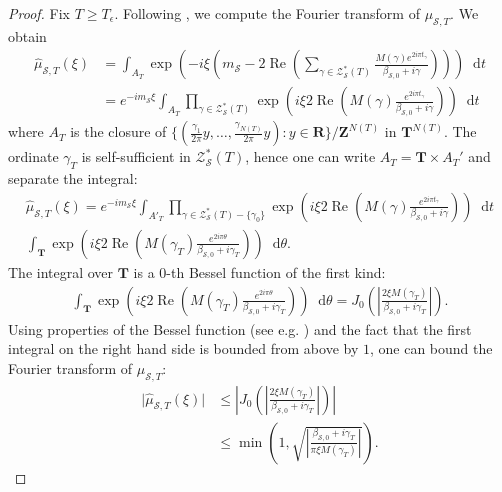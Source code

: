 \documentclass[a4paper,10pt]{amsart}
\theoremstyle{plain}
\theoremstyle{definition}
\begin{document}
\begin{proof}
Fix $T\geq T_{\epsilon}$.
	Following \cite[Part 3.1]{RS}, we compute the Fourier transform of $\mu_{\mathcal{S},T}$.
	We obtain
\begin{align*}
\hat{\mu}_{\mathcal{S},T}(\xi) &= \int_{A_{T}}\exp\left( -i\xi \left( m_{\mathcal{S}} - 2\operatorname{Re}\left(\sum_{\gamma\in\mathcal{Z}_{\mathcal{S}}^{*}(T)}\frac{M(\gamma)e^{2i\pi t_{\gamma}}}{\beta_{\mathcal{S},0}+i\gamma}\right) \right) \right){\mathop{}\!\mathrm{d}} t \\
&= e^{-im_{\mathcal{S}}\xi}\int_{A_{T}}\prod_{\gamma\in\mathcal{Z}_{\mathcal{S}}^{*}(T)}\exp\left(i\xi 2\operatorname{Re}\left(M(\gamma)\frac{e^{2i\pi t_{\gamma}}}{\beta_{\mathcal{S},0}+i\gamma}\right) \right){\mathop{}\!\mathrm{d}} t
\end{align*}
where $A_{T}$ is the closure of $\lbrace (\frac{\gamma_{1}}{2\pi}y,\ldots,\frac{\gamma_{N(T)}}{2\pi}y) : y\in \mathbf{R}\rbrace/\mathbf{Z}^{N(T)}$ in $\mathbf{T}^{N(T)}$.
The ordinate $\gamma_{T}$ is self-sufficient in $\mathcal{Z}_{\mathcal{S}}^{*}(T)$, hence one can write $A_{T}= \mathbf{T}\times A_{T}'$ and separate the integral:
\begin{multline*}
\hat{\mu}_{\mathcal{S},T}(\xi) = e^{-im_{\mathcal{S}}\xi}\int_{A'_{T}}\prod_{\gamma\in\mathcal{Z}_{\mathcal{S}}^{*}(T)-\lbrace\gamma_{0}\rbrace}\exp\left(i\xi 2\operatorname{Re}\left(M(\gamma)\frac{e^{2i\pi t_{\gamma}}}{\beta_{\mathcal{S},0}+i\gamma}\right) \right){\mathop{}\!\mathrm{d}} t \\
\int_{\mathbf{T}}\exp\left(i\xi 2\operatorname{Re}\left(M(\gamma_{T})\frac{e^{2i\pi \theta}}{\beta_{\mathcal{S},0}+i\gamma_{T}}\right) \right){\mathop{}\!\mathrm{d}}\theta.
\end{multline*}
The integral over $\mathbf{T}$ is a $0$-th Bessel function of the first kind:
\begin{align*}
\int_{\mathbf{T}}\exp\left(i\xi 2\operatorname{Re}\left(M(\gamma_{T})\frac{e^{2i\pi \theta}}{\beta_{\mathcal{S},0}+i\gamma_{T}}\right) \right){\mathop{}\!\mathrm{d}}\theta = J_{0}\left(\left\lvert\frac{2\xi M(\gamma_{T})}{\beta_{\mathcal{S},0} + i\gamma_{T}} \right\rvert\right).
\end{align*}
Using properties of the Bessel function (see e.g. \cite{Watson}) and 
the fact that the first integral on the right hand side is bounded from above by $1$, 
one can bound the Fourier transform of $\mu_{\mathcal{S},T}$:
\begin{align}\label{Bound_1T-Aut}
\lvert \hat{\mu}_{\mathcal{S},T}(\xi)\rvert &\leq \left\lvert J_{0}\left(\left\lvert\frac{2\xi M(\gamma_{T})}{\beta_{\mathcal{S},0} + i\gamma_{T}} \right\rvert\right) \right\rvert \\
&\leq \min\left( 1, \sqrt{\left\lvert\frac{\beta_{\mathcal{S},0} + i\gamma_{T}}{ \pi\xi M(\gamma_{T})}\right\rvert}  \right).\nonumber
\end{align}


\end{proof}
\end{document}
